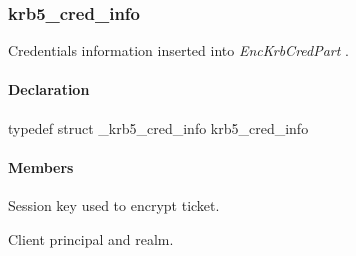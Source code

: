 \documentclass[letterpaper,10pt,english]{sphinxmanual}
\begin{document}
\subsubsection{krb5\_cred\_info}
\label{appdev/refs/types/krb5_cred_info:krb5-cred-info-struct}\label{appdev/refs/types/krb5_cred_info::doc}\label{appdev/refs/types/krb5_cred_info:krb5-cred-info}

\begin{fulllineitems}
\label{appdev/refs/types/krb5_cred_info:krb5_cred_info}
\end{fulllineitems}


Credentials information inserted into \emph{EncKrbCredPart} .


\paragraph{Declaration}
\label{appdev/refs/types/krb5_cred_info:declaration}
typedef struct \_krb5\_cred\_info  krb5\_cred\_info


\paragraph{Members}
\label{appdev/refs/types/krb5_cred_info:members}

\begin{fulllineitems}
\label{appdev/refs/types/krb5_cred_info:krb5_cred_info.magic}
\end{fulllineitems}


\begin{fulllineitems}
\label{appdev/refs/types/krb5_cred_info:krb5_cred_info.session}
Session key used to encrypt ticket.

\end{fulllineitems}


\begin{fulllineitems}
\label{appdev/refs/types/krb5_cred_info:krb5_cred_info.client}
Client principal and realm.

\end{fulllineitems}
\end{document}

